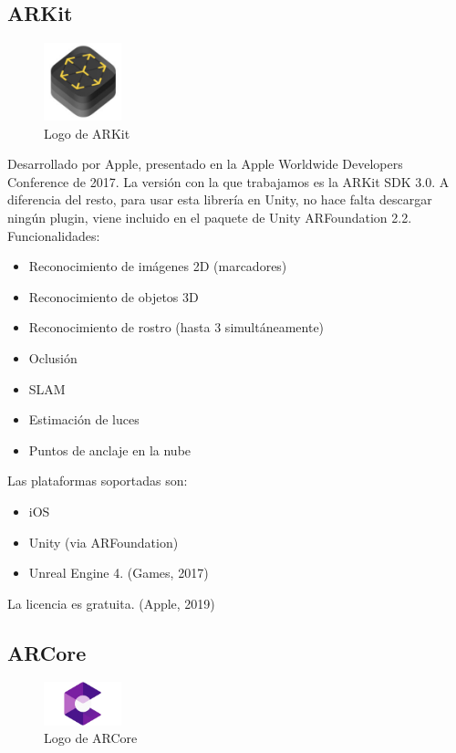 \subsection{ARKit}
\begin{figure}[H]
    \centering
    \includegraphics[width=0.2\textwidth]{Images/Arkit_Logo.jpeg}
    \caption{Logo de ARKit}
    \label{fig:Maxst}
\end{figure} 

Desarrollado por Apple, presentado en la Apple Worldwide Developers Conference de 2017.
La versión con la que trabajamos es la ARKit SDK 3.0. A diferencia del resto, para usar esta librería en Unity, no hace falta descargar ningún plugin, viene incluido en el paquete de Unity ARFoundation 2.2.
Funcionalidades:
\begin{itemize}
\item Reconocimiento de imágenes 2D (marcadores)
\item Reconocimiento de objetos 3D
\item Reconocimiento de rostro (hasta 3 simultáneamente)
\item Oclusión
\item SLAM
\item Estimación de luces
\item Puntos de anclaje en la nube
\end{itemize}
Las plataformas soportadas son:
\begin{itemize}
\item iOS 
\item Unity (via ARFoundation)
\item Unreal Engine 4. (Games, 2017)
\end{itemize}
La licencia es gratuita.
(Apple, 2019)
 
\subsection{ARCore}
 \begin{figure}[H]
    \centering
    \includegraphics[width=0.2\textwidth]{Images/ARCore.jpeg}
    \caption{Logo de ARCore}
    \label{fig:Maxst}
\end{figure}

